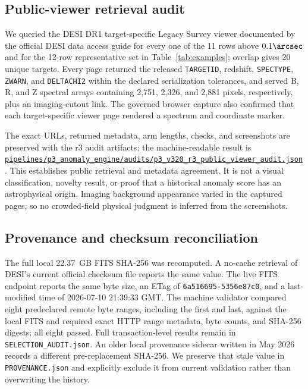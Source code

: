 \documentclass[twocolumn]{aastex701}
\newcommand{\repoBase}{https://github.com/Hubify-Projects/bigbounce/blob/main}
\newcommand{\artifact}[1]{\href{\repoBase/#1}{\nolinkurl{#1}}}
\begin{document}
\subsection{Public-viewer retrieval audit}\label{sec:viewer-audit}

We queried the DESI DR1 target-specific Legacy Survey viewer documented by the official DESI data
access guide for every one of the 11 rows above $0.1\arcsec$ and for the 12-row representative set
in Table~\ref{tab:examples}; overlap gives 20 unique targets.  Every page returned the released
\texttt{TARGETID}, redshift, \texttt{SPECTYPE}, \texttt{ZWARN}, and \texttt{DELTACHI2} within the
declared serialization tolerances, and served B, R, and Z spectral arrays containing 2,751,
2,326, and 2,881 pixels, respectively, plus an imaging-cutout link.  The governed browser capture
also confirmed that each target-specific viewer page rendered a spectrum and coordinate marker.

The exact URLs, returned metadata, arm lengths, checks, and screenshots are preserved with the r3
audit artifacts; the machine-readable result is
\artifact{pipelines/p3\_anomaly\_engine/audits/p3\_v320\_r3\_public\_viewer\_audit.json}.
This establishes public retrieval and metadata agreement.  It is not a visual classification,
novelty result, or proof that a historical anomaly score has an astrophysical origin.  Imaging
background appearance varied in the captured pages, so no crowded-field physical judgment is
inferred from the screenshots.

\subsection{Provenance and checksum reconciliation}\label{sec:checksums}

The full local 22.37~GB FITS SHA-256 was recomputed.  A no-cache retrieval of DESI's current
official checksum file reports the same value.  The live FITS endpoint reports the same byte size,
an ETag of \texttt{6a516695-5356e87c0}, and a last-modified time of 2026-07-10 21:39:33 GMT.  The
machine validator compared eight predeclared remote byte ranges, including the first and last,
against the local FITS and required exact HTTP range metadata, byte counts, and SHA-256 digests;
all eight passed.  Full transaction-level results remain in \texttt{SELECTION\_AUDIT.json}.  An older
local provenance sidecar written in May 2026 records a
different pre-replacement SHA-256.  We preserve that stale value in \texttt{PROVENANCE.json} and
explicitly exclude it from current validation rather than overwriting the history.
\end{document}

